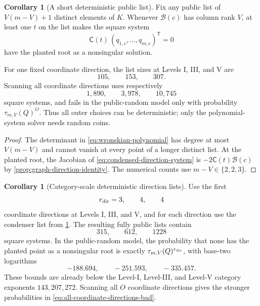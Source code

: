 \documentclass[11pt,a4paper]{article}
\theoremstyle{definition}
\newtheorem{corollary}[theorem]{Corollary}
\theoremstyle{remark}
\begin{document}
\begin{corollary}[A short deterministic public list]\label{cor:deterministic-outer-list}
Fix any public list of $V(m-V)+1$ distinct elements of $K$.  Whenever $\mathcal B(c)$ has column rank $V$, at least one $t$ on the list makes the square system
\begin{equation}\label{eq:condensed-direction-system}
 \mathsf C(t)\,(q_{1,c},\ldots,q_{m,c})^{\mathsf T}=0
\end{equation}
have the planted root as a nonsingular solution.

For one fixed coordinate direction, the list sizes at Levels I, III, and V are
\[
 105,\qquad153,\qquad307.
\]
Scanning all coordinate directions uses respectively
\[
 1{,}890,\qquad3{,}978,\qquad10{,}745
\]
square systems, and fails in the public-random model only with probability
$\tau_{m,V}(Q)^O$.  Thus all outer choices can be deterministic; only the polynomial-system solver needs random coins.
\end{corollary}

\begin{proof}
The determinant in \eqref{eq:wronskian-polynomial} has degree at most $V(m-V)$ and cannot vanish at every point of a longer distinct list.  At the planted root, the Jacobian of \eqref{eq:condensed-direction-system} is
$-2\mathsf C(t)\mathcal B(c)$ by \cref{prop:graph-direction-identity}.  The numerical counts use $m-V\in\{2,2,3\}$.
\end{proof}

\begin{corollary}[Category-scale deterministic direction lists]\label{cor:compact-direction-list}
Use the first
\[
 r_{\rm dir}=3,\qquad4,\qquad4
\]
coordinate directions at Levels I, III, and V, and for each direction use the condenser list from \cref{cor:deterministic-outer-list}.  The resulting fully public lists contain
\[
315,\qquad612,\qquad1228
\]
square systems.  In the public-random model, the probability that none has the planted point as a nonsingular root is exactly $\tau_{m,V}(Q)^{r_{\rm dir}}$, with base-two logarithms
\begin{equation}\label{eq:compact-direction-logs}
 -188.694,\qquad-251.593,\qquad-335.457.
\end{equation}
These bounds are already below the Level-I, Level-III, and Level-V category exponents $143,207,272$.  Scanning all $O$ coordinate directions gives the stronger probabilities in \eqref{eq:all-coordinate-directions-bad}.
\end{corollary}
\end{document}
